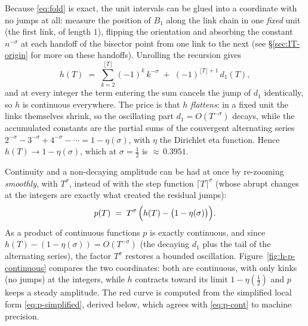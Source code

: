 \documentclass[11pt]{article}
\theoremstyle{definition}
\begin{document}
Because \eqref{eq:fold} is exact, the unit intervals can be glued into a
coordinate with no jumps at all: measure the position of $B_1$
along the link chain in one \emph{fixed} unit (the first link, of length
$1$), flipping the orientation and absorbing the constant $n^{-\sigma}$ at
each handoff of the bisector point from one link to the next (see
\S\ref{sec:IT-origin} for more on these handoffs). Unrolling the
recursion gives
\begin{equation}\label{eq:h-cont}
h(T) \;=\; \sum_{k=2}^{\lfloor T\rfloor} (-1)^{k}\,k^{-\sigma}
\;+\; (-1)^{\lfloor T\rfloor+1}\, d_1(T),
\end{equation}
and at every integer the term entering the sum cancels the jump of $d_1$
identically, so $h$ is continuous everywhere. The price is that $h$
\emph{flattens}: in a fixed unit the links themselves shrink, so the
oscillating part $d_1=O(T^{-\sigma})$ decays, while the accumulated constants
are the partial sums of the convergent alternating series
$2^{-\sigma}-3^{-\sigma}+4^{-\sigma}-\cdots = 1-\eta(\sigma)$, with $\eta$ the
Dirichlet eta function. Hence $h(T)\to 1-\eta(\sigma)$, which at
$\sigma=\tfrac12$ is ${\approx}\,0.3951$.

Continuity and a non-decaying amplitude can be had at once by re-zooming
\emph{smoothly}, with $T^{\sigma}$, instead of with the step function
$\lceil T\rceil^{\sigma}$ (whose abrupt changes at the integers are exactly
what created the residual jumps):
\begin{equation}\label{eq:p-cont}
p(T) \;=\; T^{\sigma}\,\Bigl( h(T) - \bigl(1-\eta(\sigma)\bigr) \Bigr).
\end{equation}
As a product of continuous functions $p$ is exactly continuous, and since
$h(T)-(1-\eta(\sigma)) = O(T^{-\sigma})$ (the decaying $d_1$ plus the tail
of the alternating series), the factor $T^{\sigma}$ restores a bounded
oscillation. Figure~\ref{fig:h-p-continuous} compares the two coordinates:
both are continuous, with only kinks (no jumps) at the integers, while $h$
contracts toward its limit $1-\eta(\tfrac12)$ and $p$ keeps a steady
amplitude. The red curve is computed from the simplified local form
\eqref{eq:p-simplified}, derived below, which agrees with \eqref{eq:p-cont}
to machine precision.
\end{document}
